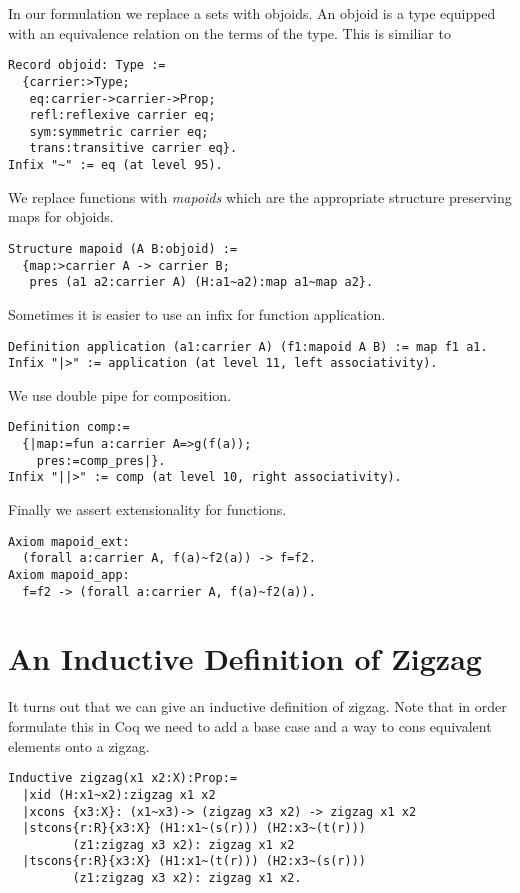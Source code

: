 \documentclass{article}
\begin{document}
In our formulation we replace a sets with objoids.
An objoid is a type equipped with an equivalence relation on the terms of the type.
This is similiar to \cite{carvalho-coq}

\begin{verbatim}
Record objoid: Type :=
  {carrier:>Type;
   eq:carrier->carrier->Prop;
   refl:reflexive carrier eq;
   sym:symmetric carrier eq;
   trans:transitive carrier eq}.
Infix "~" := eq (at level 95).
\end{verbatim}

We replace functions with \emph{mapoids} which are the appropriate structure preserving maps for objoids.

\begin{verbatim}
Structure mapoid (A B:objoid) :=
  {map:>carrier A -> carrier B;
   pres (a1 a2:carrier A) (H:a1~a2):map a1~map a2}.
\end{verbatim}

Sometimes it is easier to use an infix for function application.

\begin{verbatim}
Definition application (a1:carrier A) (f1:mapoid A B) := map f1 a1.
Infix "|>" := application (at level 11, left associativity).
\end{verbatim}

We use double pipe for composition.
\begin{verbatim}
Definition comp:=
  {|map:=fun a:carrier A=>g(f(a));
    pres:=comp_pres|}.
Infix "||>" := comp (at level 10, right associativity).
\end{verbatim}

Finally we assert extensionality for functions.
\begin{verbatim}
Axiom mapoid_ext:
  (forall a:carrier A, f(a)~f2(a)) -> f=f2.
Axiom mapoid_app:
  f=f2 -> (forall a:carrier A, f(a)~f2(a)).
\end{verbatim}

\section{An Inductive Definition of Zigzag}
\label{sec:inductive-definition-zigzag}

It turns out that we can give an inductive definition of zigzag.
Note that in order formulate this in Coq we need to add a base case and a way to cons equivalent elements onto a zigzag.
\begin{verbatim}
Inductive zigzag(x1 x2:X):Prop:=
  |xid (H:x1~x2):zigzag x1 x2
  |xcons {x3:X}: (x1~x3)-> (zigzag x3 x2) -> zigzag x1 x2
  |stcons{r:R}{x3:X} (H1:x1~(s(r))) (H2:x3~(t(r)))
         (z1:zigzag x3 x2): zigzag x1 x2
  |tscons{r:R}{x3:X} (H1:x1~(t(r))) (H2:x3~(s(r)))
         (z1:zigzag x3 x2): zigzag x1 x2.
\end{verbatim}
\end{document}
